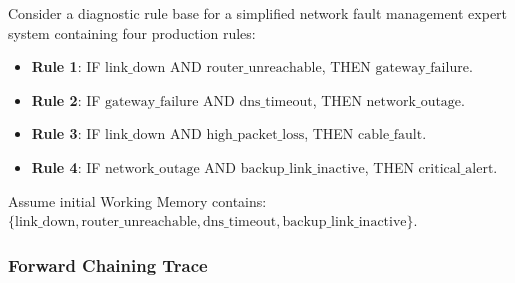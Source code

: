 \documentclass[12pt]{report}
\begin{document}
Consider a diagnostic rule base for a simplified network fault management expert system containing four production rules:

\begin{itemize}
    \item \textbf{Rule 1}: IF $\text{link\_down}$ AND $\text{router\_unreachable}$, THEN $\text{gateway\_failure}$.
    \item \textbf{Rule 2}: IF $\text{gateway\_failure}$ AND $\text{dns\_timeout}$, THEN $\text{network\_outage}$.
    \item \textbf{Rule 3}: IF $\text{link\_down}$ AND $\text{high\_packet\_loss}$, THEN $\text{cable\_fault}$.
    \item \textbf{Rule 4}: IF $\text{network\_outage}$ AND $\text{backup\_link\_inactive}$, THEN $\text{critical\_alert}$.
\end{itemize}

Assume initial Working Memory contains: $\{\text{link\_down}, \text{router\_unreachable}, \text{dns\_timeout}, \text{backup\_link\_inactive}\}$.

\subsubsection{Forward Chaining Trace}
\end{document}
